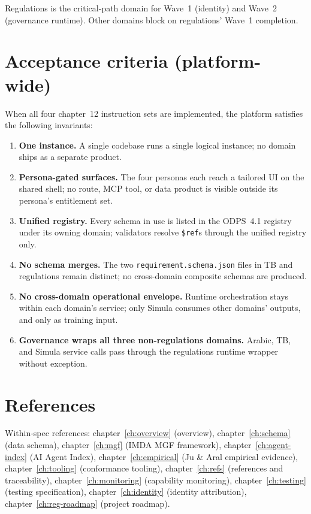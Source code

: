 Regulations is the critical-path domain for Wave~1 (identity) and
Wave~2 (governance runtime). Other domains block on regulations'
Wave~1 completion.

\section{Acceptance criteria (platform-wide)}
\label{sec:agent-acceptance}
When all four chapter~12 instruction sets are implemented, the
platform satisfies the following invariants:

\begin{enumerate}
  \item \textbf{One instance.} A single codebase runs a single
    logical instance; no domain ships as a separate product.
  \item \textbf{Persona-gated surfaces.} The four personas each
    reach a tailored UI on the shared shell; no route, MCP tool, or
    data product is visible outside its persona's entitlement set.
  \item \textbf{Unified registry.} Every schema in use is listed in
    the ODPS~4.1 registry under its owning domain; validators
    resolve \texttt{\$ref}s through the unified registry only.
  \item \textbf{No schema merges.} The two
    \texttt{requirement.schema.json} files in TB and regulations
    remain distinct; no cross-domain composite schemas are produced.
  \item \textbf{No cross-domain operational envelope.} Runtime
    orchestration stays within each domain's service; only Simula
    consumes other domains' outputs, and only as training input.
  \item \textbf{Governance wraps all three non-regulations domains.}
    Arabic, TB, and Simula service calls pass through the
    regulations runtime wrapper without exception.
\end{enumerate}

\section{References}
\label{sec:agent-references}
Within-spec references:
chapter~\ref{ch:overview} (overview),
chapter~\ref{ch:schema} (data schema),
chapter~\ref{ch:mgf} (IMDA MGF framework),
chapter~\ref{ch:agent-index} (AI Agent Index),
chapter~\ref{ch:empirical} (Ju \& Aral empirical evidence),
chapter~\ref{ch:tooling} (conformance tooling),
chapter~\ref{ch:refs} (references and traceability),
chapter~\ref{ch:monitoring} (capability monitoring),
chapter~\ref{ch:testing} (testing specification),
chapter~\ref{ch:identity} (identity attribution),
chapter~\ref{ch:reg-roadmap} (project roadmap).

